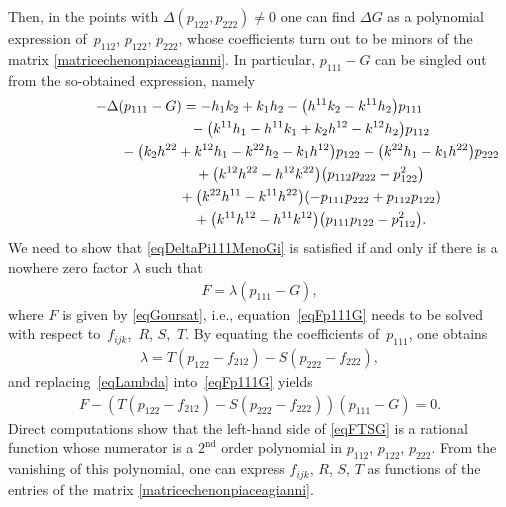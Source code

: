\documentclass[pdftex]{sigma}
\newcommand{\Nd}{^\textrm{nd}}
\numberwithin{equation}{section}
\begin{document}
Then, in the points with $\Delta(p_{122},p_{222})\neq 0$ one can f\/ind $\Delta G$ as a polynomial expression of~$p_{112}$, $p_{122}$, $p_{222}$, whose coef\/f\/icients turn out to be minors of the matrix \eqref{matricechenonpiaceagianni}. In particular, $p_{111}-G$ can be singled out from the so-obtained expression, namely
\begin{gather}
-\Delta(p_{111}-G) =-h_1k_2+k_1h_2-\big(h^{11}k_2-k^{11}h_2\big)p_{111} \nonumber\\
\hphantom{-\Delta(p_{111}-G) =}{} -\big(k^{11}h_1-h^{11}k_1+k_2h^{12}-k^{12}h_2\big)p_{112}\nonumber\\
\hphantom{-\Delta(p_{111}-G) =}{}-\big(k_2h^{22}+k^{12}h_1-k^{22}h_2-k_1h^{12}\big)p_{122}-\big(k^{22}h_1-k_1h^{22}\big)p_{222} \nonumber\\
\hphantom{-\Delta(p_{111}-G) =}{}+\big(k^{12}h^{22}-h^{12}k^{22}\big)\big(p_{112}p_{222}-p_{122}^2\big) \nonumber\\
\hphantom{-\Delta(p_{111}-G) =}{} + \big(k^{22}h^{11}-k^{11}h^{22}\big)(-p_{111}p_{222}+p_{112}p_{122}) \nonumber\\
\hphantom{-\Delta(p_{111}-G) =}{}+\big(k^{11}h^{12}-h^{11}k^{12}\big) \big(p_{111}p_{122}-p_{112}^2\big).\label{eqDeltaPi111MenoGi}
\end{gather}
We need to show that \eqref{eqDeltaPi111MenoGi} is satisf\/ied if and only if there is a nowhere zero factor $\lambda$ such that
 \begin{gather}\label{eqFp111G}
F=\lambda (p_{111}-G),
\end{gather}
where $F$ is given by \eqref{eqGoursat}, i.e., equation~\eqref{eqFp111G} needs to be solved with respect to~$f_{ijk}$,~$R$, $S$,~$T$. By equating the coef\/f\/icients of~$p_{111}$, one obtains
\begin{gather}\label{eqLambda}
\lambda= T(p_{122}-f_{212})-S(p_{222}-f_{222}),
\end{gather}
and replacing~\eqref{eqLambda} into~\eqref{eqFp111G} yields
\begin{gather}\label{eqFTSG}
F-( T(p_{122}-f_{212})-S(p_{222}-f_{222}))(p_{111}-G)=0.
\end{gather}
Direct computations show that the left-hand side of
 \eqref{eqFTSG} is a rational function whose numerator is a $2\Nd$ order polynomial in $p_{112}$, $p_{122}$, $p_{222}$. From the vanishing of this polynomial, one can express $f_{ijk}$, $R$, $S$, $T $ as functions of the entries of the matrix \eqref{matricechenonpiaceagianni}.
\end{document}

